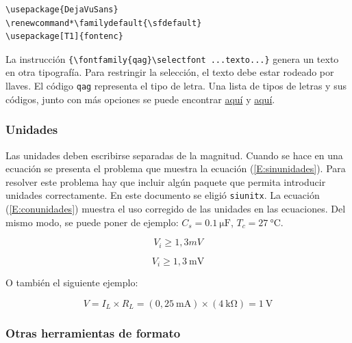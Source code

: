 \begin{verbatim}
\usepackage{DejaVuSans}
\renewcommand*\familydefault{\sfdefault} 
\usepackage[T1]{fontenc}
\end{verbatim}

La instrucción \verb+{\fontfamily{qag}\selectfont ...texto...}+ genera {\selectfont un texto en otra tipografía. Para restringir la selección, el texto debe estar rodeado por llaves}. El código \texttt{qag} representa el tipo de letra. Una lista de tipos de letras y sus códigos, junto con más opciones se puede encontrar \href{https://www.sharelatex.com/learn/Font_typefaces}{aquí} y \href{http://tex.stackexchange.com/questions/25249/how-do-i-use-a-particular-font-for-a-small-section-of-text-in-my-document}{aquí}.

\subsubsection{Unidades}

Las unidades deben escribirse separadas de la magnitud. Cuando se hace en una ecuación se presenta el problema que muestra la ecuación (\ref{E:sinunidades}). Para resolver este problema hay que incluir algún paquete que permita introducir unidades correctamente. En este documento se eligió \verb+siunitx+. La ecuación (\ref{E:conunidades}) muestra el uso corregido de las unidades en las ecuaciones. Del mismo modo, se puede poner de ejemplo: $C_s = \SI{0.1}{\micro\farad}$, $T_c = \SI{27}{\degreeCelsius}$. 

\begin{equation}\label{E:sinunidades}
{V}_{i}\ge 1,3 mV
\end{equation}

\begin{equation}\label{E:conunidades}
{V}_{i} \ge 1,3~\si{\milli\volt}
\end{equation}

O también el siguiente ejemplo:

\begin{equation}\label{E:unidades}
V = I_L \times R_L = \left( 0,25~\si{\milli\ampere} \right) \times \left( \SI{4}{\kilo\ohm} \right) = 1~\si{\volt} 
\end{equation}

\subsubsection{Otras herramientas de formato}

